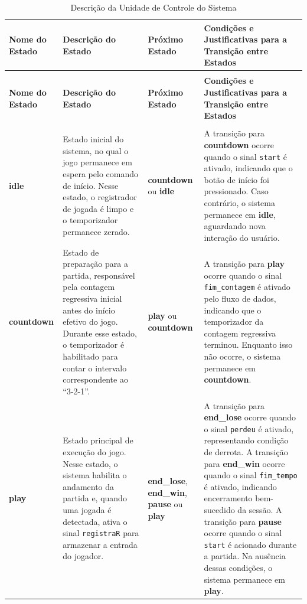 \documentclass[a4paper,12pt,twoside]{article}
\begin{document}
\begin{longtable}{|>{\centering\arraybackslash}p{}|>{\centering\arraybackslash}p{}|>{\centering\arraybackslash}p{}|>{\centering\arraybackslash}p{}|}
\caption{Descrição da Unidade de Controle do Sistema} \label{tab:uc_descricao} \\
\hline
\textbf{Nome do Estado} & \textbf{Descrição do Estado} & \textbf{Próximo Estado} & \textbf{Condições e Justificativas para a Transição entre Estados} \\ \hline
\endfirsthead

\multicolumn{4}{c}{{\bfseries \tablename\ \thetable{} -- Continuação da página anterior}} \\
\hline
\textbf{Nome do Estado} & \textbf{Descrição do Estado} & \textbf{Próximo Estado} & \textbf{Condições e Justificativas para a Transição entre Estados} \\ \hline
\endhead

\hline \multicolumn{4}{|r|}{{Continua na próxima página...}} \\ \hline
\endfoot

\endlastfoot

\textbf{idle} 
& Estado inicial do sistema, no qual o jogo permanece em espera pelo comando de início. Nesse estado, o registrador de jogada é limpo e o temporizador permanece zerado. 
& \textbf{countdown} ou \textbf{idle} 
& A transição para \textbf{countdown} ocorre quando o sinal \texttt{start} é ativado, indicando que o botão de início foi pressionado. Caso contrário, o sistema permanece em \textbf{idle}, aguardando nova interação do usuário. \\ \hline

\textbf{countdown} 
& Estado de preparação para a partida, responsável pela contagem regressiva inicial antes do início efetivo do jogo. Durante esse estado, o temporizador é habilitado para contar o intervalo correspondente ao ``3-2-1''. 
& \textbf{play} ou \textbf{countdown} 
& A transição para \textbf{play} ocorre quando o sinal \texttt{fim\_contagem} é ativado pelo fluxo de dados, indicando que o temporizador da contagem regressiva terminou. Enquanto isso não ocorre, o sistema permanece em \textbf{countdown}. \\ \hline

\textbf{play} 
& Estado principal de execução do jogo. Nesse estado, o sistema habilita o andamento da partida e, quando uma jogada é detectada, ativa o sinal \texttt{registraR} para armazenar a entrada do jogador. 
& \textbf{end\_lose}, \textbf{end\_win}, \textbf{pause} ou \textbf{play} 
& A transição para \textbf{end\_lose} ocorre quando o sinal \texttt{perdeu} é ativado, representando condição de derrota. A transição para \textbf{end\_win} ocorre quando o sinal \texttt{fim\_tempo} é ativado, indicando encerramento bem-sucedido da sessão. A transição para \textbf{pause} ocorre quando o sinal \texttt{start} é acionado durante a partida. Na ausência dessas condições, o sistema permanece em \textbf{play}. \\ \hline


\end{longtable}
\end{document}
